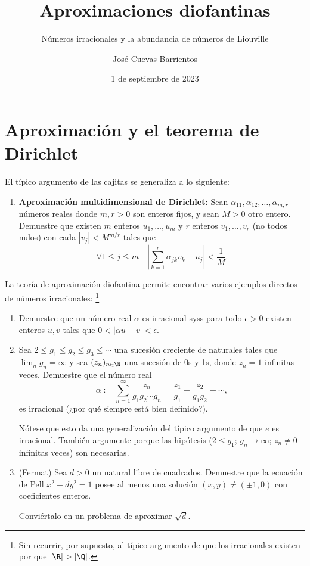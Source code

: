 \documentclass[11pt, reqno]{amsart}
\title{Aproximaciones diofantinas}
\subtitle{Números irracionales y la abundancia de números de Liouville}
\date{1 de septiembre de 2023}
\author[José Cuevas]{José Cuevas Barrientos}
\begin{document}
\maketitle

\section{Aproximación y el teorema de Dirichlet}
El típico argumento de las cajitas se generaliza a lo siguiente:
\begin{enumerate}
	\item \hard
		\textbf{Aproximación multidimensional de Dirichlet:}
		Sean $\alpha_{11}, \alpha_{12}, \dots, \alpha_{m,r}$ números reales donde $m, r > 0$ son enteros fijos, y sean $M > 0$ otro entero.
		Demuestre que existen $m$ enteros $u_1, \dots, u_m$ y $r$ enteros $v_1, \dots, v_r$ (no todos nulos) con cada $|v_j| < M^{m/r}$
		tales que
		$$ \forall 1 \le j \le m \quad \left| \sum_{k=1}^{r} \alpha_{jk} v_k - u_j \right| < \frac{1}{M}. $$
\end{enumerate}

La teoría de aproximación diofantina permite encontrar varios ejemplos directos de números irra\-cionales:%
\footnote{Sin recurrir, por supuesto, al típico argumento de que los irracionales existen por que $|\R| > |\Q|$.}
\begin{enumerate}[resume]
	\item Demuestre que un número real $\alpha$ es irracional syss para todo $\epsilon > 0$ existen enteros $u, v$
		tales que $0 < |\alpha u - v| < \epsilon$.
	\item Sea $2 \le g_1 \le g_2 \le g_3 \le \cdots$ una sucesión creciente de naturales tales que $\lim_n g_n = \infty$
		y sea $(z_n)_{n\in\N}$ una sucesión de 0s y 1s, donde $z_n = 1$ infinitas veces.
		Demuestre que el número real
		$$ \alpha := \sum_{n=1}^{\infty} \frac{z_n}{g_1 g_2 \cdots g_n} = \frac{z_1}{g_1} + \frac{z_2}{g_1g_2} + \cdots, $$
		es irracional (¿por qué siempre está bien definido?).

		Nótese que esto da una generalización del típico argumento de que $e$ es irracional.
		También argumente porque las hipótesis ($2 \le g_1$; $g_n \to \infty$; $z_n \ne 0$ infinitas veces) son necesarias.
	\item \hard
		(Fermat) Sea $d > 0$ un natural libre de cuadrados.
		Demuestre que la ecuación de Pell $x^2 - dy^2 = 1$ posee al menos una solución $(x, y) \ne (\pm 1, 0)$ con coeficientes enteros.

		\begin{hint}
			Conviértalo en un problema de aproximar $\sqrt{d}$.
		\end{hint}
\end{enumerate}
\end{document}
